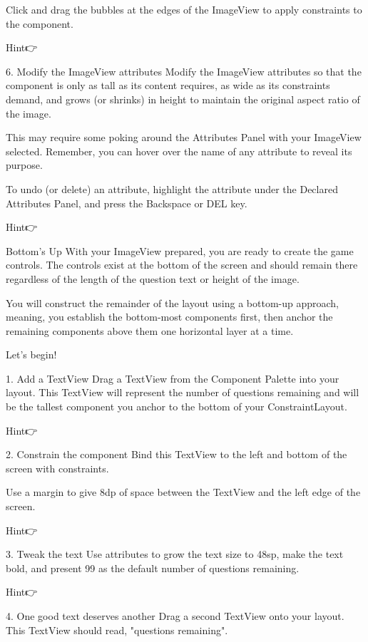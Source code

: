         Click and drag the bubbles at the edges of the ImageView to apply constraints to the component.

        Hint👉

    6. Modify the ImageView attributes
        Modify the ImageView attributes so that the component is only as tall as its content requires, as wide as its constraints demand, and grows (or shrinks) in height to maintain the original aspect ratio of the image.

        This may require some poking around the Attributes Panel with your ImageView selected. Remember, you can hover over the name of any attribute to reveal its purpose.

        To undo (or delete) an attribute, highlight the attribute under the Declared Attributes Panel, and press the Backspace or DEL key.

        Hint👉

    Bottom’s Up
        With your ImageView prepared, you are ready to create the game controls. The controls exist at the bottom of the screen and should remain there regardless of the length of the question text or height of the image.

        You will construct the remainder of the layout using a bottom-up approach, meaning, you establish the bottom-most components first, then anchor the remaining components above them one horizontal layer at a time.

        Let’s begin!

        1. Add a TextView
        Drag a TextView from the Component Palette into your layout. This TextView will represent the number of questions remaining and will be the tallest component you anchor to the bottom of your ConstraintLayout.

        Hint👉

    2. Constrain the component
        Bind this TextView to the left and bottom of the screen with constraints.

        Use a margin to give 8dp of space between the TextView and the left edge of the screen.

        Hint👉

    3. Tweak the text
        Use attributes to grow the text size to 48sp, make the text bold, and present 99 as the default number of questions remaining.

        Hint👉

    4. One good text deserves another
        Drag a second TextView onto your layout. This TextView should read, "questions remaining".

